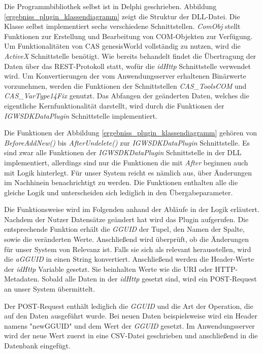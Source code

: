 Die Programmbibliothek selbst ist in Delphi geschrieben. Abbildung \ref{ergebniss_plugin_klassendiagramm} zeigt die Struktur der DLL-Datei. Die Klasse selbst implementiert sechs verschiedene Schnittstellen. \textit{ComObj} stellt Funktionen zur Erstellung und Bearbeitung von COM-Objekten zur Verfügung. Um Funktionalitäten von CAS genesisWorld vollständig zu nutzen, wird die \textit{ActiveX} Schnittstelle benötigt. Wie bereits behandelt findet die Übertragung der Daten über das REST-Protokoll statt, wofür die \textit{idHttp} Schnittstelle verwendet wird. Um Konvertierungen der vom Anwendungsserver erhaltenen Binärwerte vorzunehmen, werden die Funktionen der Schnittstellen \textit{CAS\_ToolsCOM} und \textit{CAS\_VarType14Fix} genutzt. Das Abfangen der geänderten Daten, welches die eigentliche Kernfunktionalität darstellt, wird durch die Funktionen der \textit{IGWSDKDataPlugin} Schnittstelle implementiert.

Die Funktionen der Abbildung \ref{ergebniss_plugin_klassendiagramm} gehören von \textit{BeforeAddNew()} bis \textit{AfterUndelete()} zur \textit{IGWSDKDataPlugin} Schnittstelle. Es sind zwar alle Funktionen der \textit{IGWSDKDataPlugin} Schnittstelle in der DLL implementiert, allerdings sind nur die Funktionen die mit \textit{After} beginnen auch mit Logik hinterlegt. Für unser System reicht es nämlich aus, über Änderungen im Nachhinein benachrichtigt zu werden. Die Funktionen enthalten alle die gleiche Logik und unterscheiden sich lediglich in den Übergabeparameter.

Die Funktionsweise wird im Folgenden anhand der Abläufe in der Logik erläutert. Nachdem der Nutzer Datensätze geändert hat wird das Plugin aufgerufen. Die entsprechende Funktion erhält die \textit{GGUID} der Tupel, den Namen der Spalte, sowie die veränderten Werte. Anschließend wird überprüft, ob die Änderungen für unser System von Relevanz ist. Falls sie sich als relevant herausstellen, wird die \textit{aGGUID} in einen String konvertiert. Anschließend werden die Header-Werte der \textit{idHttp} Variable gesetzt. Sie beinhalten Werte wie die URI oder HTTP-Metadaten. Sobald alle Daten in der \textit{idHttp} gesetzt sind, wird ein POST-Request an unser System übermittelt. 

Der POST-Request enthält lediglich die \textit{GGUID} und die Art der Operation, die auf den Daten ausgeführt wurde. Bei neuen Daten beispielsweise wird ein Header namens "newGGUID" und dem Wert der \textit{GGUID} gesetzt. Im Anwendungsserver wird der neue Wert zuerst in eine CSV-Datei geschrieben und anschließend in die Datenbank eingefügt.


